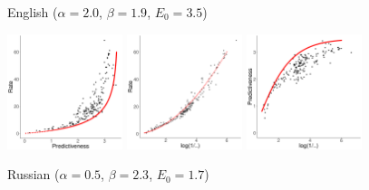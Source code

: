 \documentclass[entropy,article,submit,moreauthors,pdftex,10pt,a4paper]{Definitions/mdpi}
\begin{document}
\begin{figure}
	\begin{center}
		English {\tiny{($\alpha=2.0$, $\beta=1.9$, $E_0=3.5$)}}


\includegraphics[width=0.3\textwidth]{code/figures/en-words-info-fitted.pdf}
\includegraphics[width=0.3\textwidth]{code/figures/en-words-nlogbeta-mem-fitted.pdf}
\includegraphics[width=0.3\textwidth]{code/figures/en-words-nlogbeta-ee-fitted.pdf}

		Russian {\tiny ($\alpha=0.5$, $\beta=2.3$, $E_0=1.7$)}



\end{center}
\end{figure}
\end{document}
